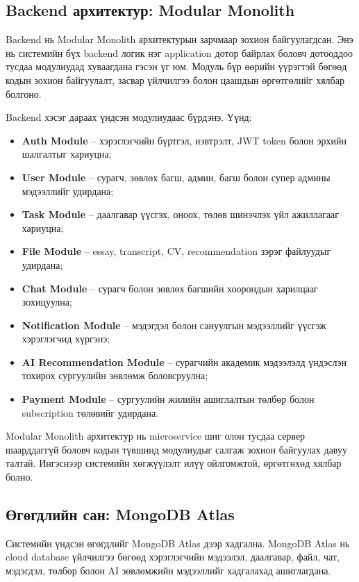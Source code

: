 \subsection*{Backend архитектур: Modular Monolith}

Backend нь Modular Monolith архитектурын зарчмаар зохион байгуулагдсан.
Энэ нь системийн бүх backend логик нэг application дотор байрлах боловч
дотооддоо тусдаа модулиудад хуваагдана гэсэн үг юм. Модуль бүр өөрийн
үүрэгтэй бөгөөд кодын зохион байгуулалт, засвар үйлчилгээ болон цаашдын
өргөтгөлийг хялбар болгоно.

Backend хэсэг дараах үндсэн модулиудаас бүрдэнэ. Үүнд:

\begin{itemize}
    \item \textbf{Auth Module} -- хэрэглэгчийн бүртгэл, нэвтрэлт, JWT token болон эрхийн шалгалтыг хариуцна;
    \item \textbf{User Module} -- сурагч, зөвлөх багш, админ, багш болон супер админы мэдээллийг удирдана;
    \item \textbf{Task Module} -- даалгавар үүсгэх, оноох, төлөв шинэчлэх үйл ажиллагааг хариуцна;
    \item \textbf{File Module} -- essay, transcript, CV, recommendation зэрэг файлуудыг удирдана;
    \item \textbf{Chat Module} -- сурагч болон зөвлөх багшийн хоорондын харилцааг зохицуулна;
    \item \textbf{Notification Module} -- мэдэгдэл болон сануулгын мэдээллийг үүсгэж хэрэглэгчид хүргэнэ;
    \item \textbf{AI Recommendation Module} -- сурагчийн академик мэдээлэлд үндэслэн тохирох сургуулийн зөвлөмж боловсруулна;
    \item \textbf{Payment Module} -- сургуулийн жилийн ашиглалтын төлбөр болон subscription төлөвийг удирдана.
\end{itemize}

Modular Monolith архитектур нь microservice шиг олон тусдаа сервер шаарддаггүй
боловч кодын түвшинд модулиудыг салгаж зохион байгуулах давуу талтай.
Ингэснээр системийн хөгжүүлэлт илүү ойлгомжтой, өргөтгөхөд хялбар болно.

\subsection*{Өгөгдлийн сан: MongoDB Atlas}

Системийн үндсэн өгөгдлийг MongoDB Atlas дээр хадгална. MongoDB Atlas нь
cloud database үйлчилгээ бөгөөд хэрэглэгчийн мэдээлэл, даалгавар, файл,
чат, мэдэгдэл, төлбөр болон AI зөвлөмжийн мэдээллийг хадгалахад ашиглагдана.

